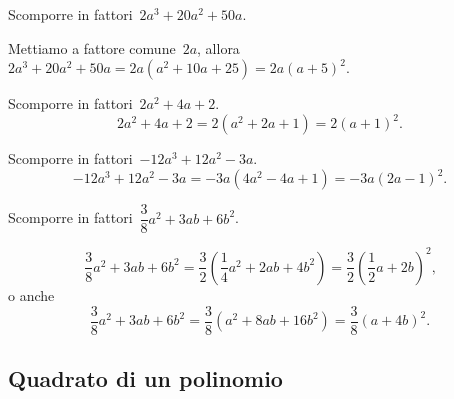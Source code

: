 \begin{exrig}
 \begin{esempio}
Scomporre in fattori~$2a^{3}+20a^{2}+50a$.

Mettiamo a fattore comune~$2a$, allora~$2a^{3}+20a^{2}+50a=2a(a^{2}+10a+25)=2a(a+5)^{2}$.
 \end{esempio}

 \begin{esempio}
Scomporre in fattori~$2a^{2}+4a+2$.
\[2a^{2}+4a+2=2\left(a^{2}+2a+1\right)=2(a+1)^{2}.\]
 \end{esempio}

 \begin{esempio}
Scomporre in fattori~$-12a^{3}+12a^{2}-3a$.
\[-12a^{3}+12a^{2}-3a=-3a\left(4a^{2}-4a+1\right)=-3a(2a-1)^{2}.\]
 \end{esempio}

 \begin{esempio}
Scomporre in fattori~$\dfrac{3}{8}a^{2}+3ab+6b^{2}$.

\[\frac{3}{8}a^{2}+3ab+6b^{2}=\frac{3}{2}\left(\frac{1}{4}a^{2}+2ab+4b^{2}\right)=\frac{3}{2}\left(\frac{1}{2}a+2b\right)^{2}\text{,}\]
o anche
\[\frac{3}{8}a^{2}+3ab+6b^{2}=\frac{3}{8}\left(a^{2}+8ab+16b^{2} \right)=\frac{3}{8}\left(a+4b\right)^{2}.\]
 \end{esempio}
\end{exrig}
\ovalbox{\risolvii \ref{ese:13.35}, \ref{ese:13.36}, \ref{ese:13.37}, \ref{ese:13.38}, \ref{ese:13.39}, \ref{ese:13.40}, \ref{ese:13.41}, \ref{ese:13.42}, \ref{ese:13.43}, \ref{ese:13.44}}

\subsection{Quadrato di un polinomio}

